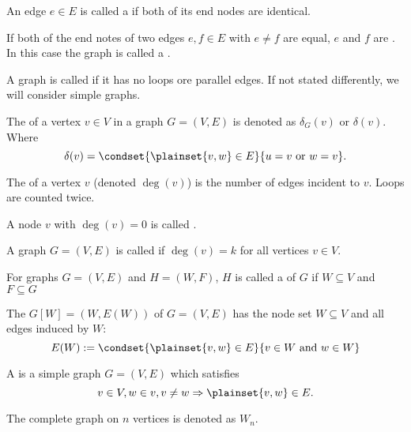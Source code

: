 \begin{defn}
  An edge $e \in E$ is called a  if both of its end nodes are identical.
\end{defn}

\begin{defn}
  If both of the end notes of two edges $e, f \in E$ with $e \neq f$ are equal, $e$ and $f$ are . In this case the graph is called a .
\end{defn}

\begin{defn}
  A graph is called  if it has no loops ore parallel edges. If not stated differently, we will consider simple graphs.
\end{defn}

\begin{defn}
  The  of a vertex $v \in V$ in a graph $G=(V,E)$ is denoted as $\delta_G(v)$ or $\delta(v)$. Where \[
    \delta(v) = \condset{\plainset{v,w} \in E}{u=v \text{ or } w=v}.
  \]
\end{defn}

\begin{defn}
  The  of a vertex $v$ (denoted $\deg(v)$) is the number of edges incident to $v$. Loops are counted twice.
  
  A node $v$ with $\deg(v)=0$ is called .
\end{defn}

\begin{defn}
  A graph $G = (V,E)$ is called  if $\deg(v) = k$ for all vertices $v \in V$.
\end{defn}

\begin{defn}
  For graphs $G=(V,E)$ and $H=(W,F)$, $H$ is called a  of $G$ if $W \subseteq V$ and $F \subseteq G$
\end{defn}

\begin{defn}
  The  $G[W] = (W, E(W))$ of $G=(V,E)$ has the node set $W \subseteq V$ and all edges induced by $W$:
  \[
    E(W):=\condset{\plainset{v,w}\in E}{v\in W \text{ and } w \in W}
  \]
\end{defn}

\begin{defn}
  A  is a simple graph $G = (V,E)$ which satisfies \[
    v\in V, w\in v, v\neq w \Rightarrow \plainset{v,w} \in E.
  \]
  
  The complete graph on $n$ vertices is denoted as $W_n$.
\end{defn}

